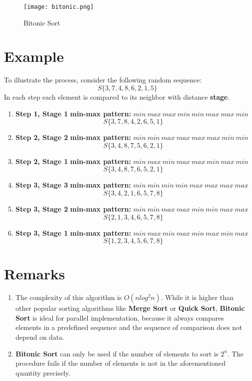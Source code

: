 \documentclass[12pt]{report}
\begin{document}
\begin{figure}
    \centering
    \texttt{[image: bitonic.png]}
    \caption{Bitonic Sort}
    \label{fig:enter-label}
\end{figure}
\section{Example}

To illustrate the process, consider the following random sequence:
\[S\{ 3,7,4,8,6,2,1,5 \}\]
In each step each element is compared to its neighbor with distance \textbf{stage}.

\begin{enumerate}
    \item \textbf{Step 1, Stage 1}
    \textbf{min-max pattern:} $min\:max\:max\:min\:min\:max\:max\:min$
    \[
        S\{3,7,8,4,2,6,5,1\}
    \] 
    \item \textbf{Step 2, Stage 2}
    \textbf{min-max pattern:} $min\:min\:max\:max\:max\:max\:min\:min$
    \[
        S\{3,4,8,7,5,6,2,1\}
    \]
    \item \textbf{Step 2, Stage 1}
    \textbf{min-max pattern:} $min\:max\:min\:max\:max\:min\:max\:min$
    \[
        S\{3,4,8,7,6,5,2,1\}
    \]
    \item \textbf{Step 3, Stage 3}
    \textbf{min-max pattern:} $min\:min\:min\:min\:max\:max\:max\:max$
    \[
        S\{3,4,2,1,6,5,7,8\}
    \]
    \item \textbf{Step 3, Stage 2}
    \textbf{min-max pattern:} $min\:min\:max\:max\:min\:min\:max\:max$
    \[
        S\{2,1,3,4,6,5,7,8\}
    \]
    \item \textbf{Step 3, Stage 1}
    \textbf{min-max pattern:} $min\:max\:min\:max\:min\:max\:min\:max$
    \[
        S\{1, 2, 3, 4, 5, 6, 7, 8\}
    \]
\end{enumerate}

\section{Remarks}
\begin{enumerate}
\item The complexity of this algorithm is $O(nlog^2n)$. While it is higher than other popular sorting algorithms like \textbf{Merge Sort} or \textbf{Quick Sort},  \textbf{Bitonic Sort} is ideal for parallel implementation, because it always compares elements in a predefined sequence and the sequence of comparison does not depend on data. 
\item \textbf{Bitonic Sort} can only be used if the number of elements to sort is $2^n$. The procedure fails if the number of elements is not in the aforementioned quantity precisely.
\end{enumerate}
        
\end{document}
